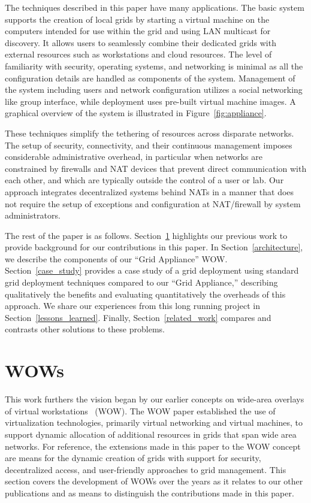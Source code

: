 \documentclass[twocolumn]{svjour3}
\begin{document}
The techniques described in this paper have many applications.  The basic
system supports the creation of local grids by starting a virtual machine on
the computers intended for use within the grid and using LAN multicast for
discovery.  It allows users to seamlessly combine their dedicated grids with
external resources such as workstations and cloud resources.  The level of
familiarity with security, operating systems, and networking is minimal as all
the configuration details are handled as components of the system.  Management
of the system including users and network configuration utilizes a social
networking like group interface, while deployment uses pre-built virtual
machine images.  A graphical overview of the system is illustrated in
Figure~\ref{fig:appliance}.

These techniques simplify the tethering of resources across disparate networks.
The setup of security, connectivity, and their continuous management imposes
considerable administrative overhead, in particular when networks are
constrained by firewalls and NAT devices that prevent direct communication with
each other, and which are typically outside the control of a user or lab.  Our
approach integrates decentralized systems behind NATs in a manner that does not
require the setup of exceptions and configuration at NAT/firewall by system
administrators.

The rest of the paper is as follows.  Section~\ref{wow} highlights our previous
work to provide background for our contributions in this paper.  In
Section~\ref{architecture}, we describe the components of our ``Grid
Appliance'' WOW.  Section~\ref{case_study} provides a case study of a grid
deployment using standard grid deployment techniques compared to our ``Grid
Appliance,'' describing qualitatively the benefits and evaluating
quantitatively the overheads of this approach.  We share our experiences from
this long running project in Section~\ref{lessons_learned}.  Finally,
Section~\ref{related_work} compares and contrasts other solutions to these
problems.

\section{WOWs}
\label{wow}

This work furthers the vision began by our earlier concepts on wide-area
overlays of virtual workstations~\cite{wow} (WOW).  The WOW paper established
the use of virtualization technologies, primarily virtual networking and
virtual machines, to support dynamic allocation of additional resources in
grids that span wide area networks.  For reference, the extensions made in this
paper to the WOW concept are means for the dynamic creation of grids with
support for security, decentralized access, and user-friendly approaches to
grid management.  This section covers the development of WOWs over the years as
it relates to our other publications and as means to distinguish the
contributions made in this paper.
\end{document}
